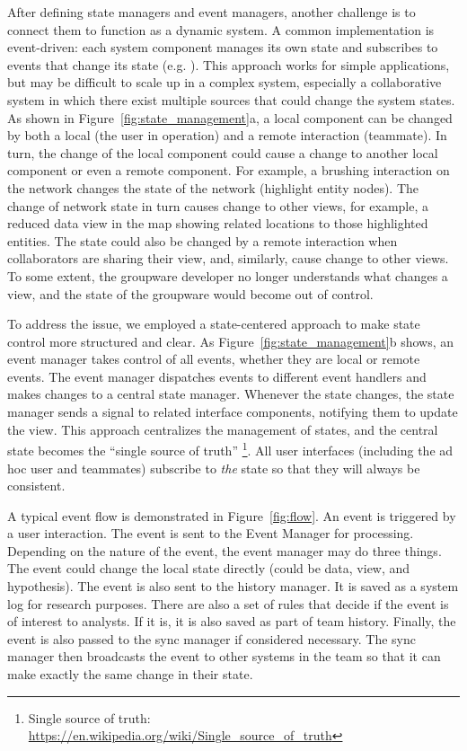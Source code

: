 After defining state managers and event managers, another challenge is to connect them to function as a dynamic system. A common implementation is event-driven:
each system component manages its own state and subscribes to events that change its state (e.g. \cite{hardisty2011geoviz}). This approach works for simple applications, but may be difficult to scale up in a complex system, especially a collaborative system in which there exist multiple sources that could change the system states. As shown in Figure~\ref{fig:state_management}a, a local
component can be changed by both a local (the user in operation) and a remote interaction (teammate). In turn, the
change of the local component could cause a change to another local component or
even a remote component. For example, a brushing interaction on the network changes
the state of the network (highlight entity nodes). The change of network state
in turn causes change to other views, for example, a reduced data view in the
map showing related locations to those highlighted entities. The state could
also be changed by a remote interaction when collaborators are sharing their
view, and, similarly, cause change to other views. To some extent, the groupware
developer no longer understands what changes a view, and the state of the
groupware would become out of control.

To address the issue, we employed a state-centered approach to make state control more structured and
clear. As Figure~\ref{fig:state_management}b shows, an event manager takes control of all events, whether
they are local or remote events. The event manager dispatches events to
different event handlers and makes changes to a central state manager. Whenever
the state changes, the state manager sends a signal to related interface
components, notifying them to update the view. This approach centralizes the
management of states, and the central state becomes the ``single source of truth'' \footnote{Single source of truth: \url{https://en.wikipedia.org/wiki/Single_source_of_truth}}. 
All user interfaces (including the ad hoc user and teammates) subscribe to \emph{the} state so that they will always be consistent. 

A typical event flow is demonstrated in Figure~\ref{fig:flow}. An event is triggered by a user
interaction. The event is sent to the Event Manager for processing. Depending on the nature of the event, the event manager may do three things. The event could change the local state directly (could be data, view, and hypothesis). The event is also sent to the history manager. It is saved as a system log for research purposes. There are also a set of rules that decide if the event is of interest to analysts. If it is, it is also saved as part of team history. Finally, the event is also passed to the sync manager if considered necessary. The sync manager then broadcasts the event to other systems in the team so that it can make exactly the same change in their state. 




